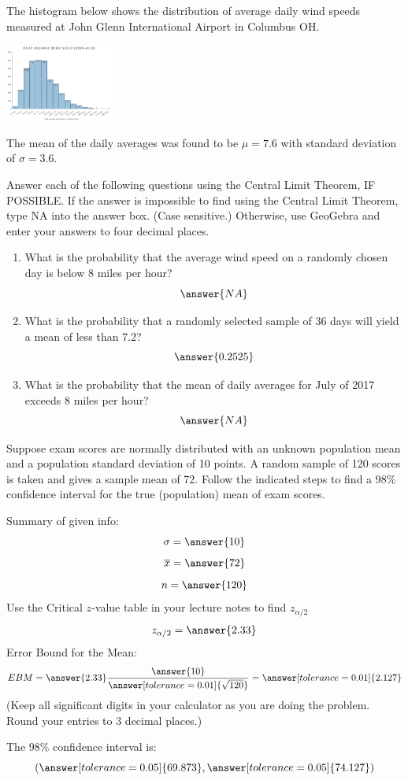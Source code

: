 \documentclass{ximera}
\begin{document}
\begin{problem}\label{prob:140hom6prob3}
The histogram below shows the distribution of average daily wind speeds measured at John Glenn International Airport in Columbus OH.
\begin{image}
   \includegraphics[height=1in]{140H6pic1.jpg}
 \end{image}
 The mean of the daily averages was found to be $\mu=7.6$ with standard deviation of $\sigma=3.6$.
 
 Answer each of the following questions using the Central Limit Theorem, IF POSSIBLE.  If the answer is impossible to find using the Central Limit Theorem, type NA into the answer box. (Case sensitive.)  Otherwise, use GeoGebra and enter your answers to four decimal places.
 \begin{enumerate}
     \item What is the probability that the average wind speed on a randomly chosen day is below 8 miles per hour?
     $$\answer{NA}$$
     \item What is the probability that a randomly selected sample of 36 days will yield a mean of less than 7.2?
     $$\answer{0.2525}$$
     \item What is the probability that the mean of daily averages for July of 2017 exceeds 8 miles per hour?
     $$\answer{NA}$$
     
 \end{enumerate}
\end{problem}
 
\begin{problem}\label{prob:140hom6prob4}
Suppose exam scores are normally distributed with an unknown population mean and a population standard deviation of 10 points. A random sample of 120 scores is taken and gives a sample mean of 72. Follow the indicated steps to find a 98\% confidence interval for the true (population) mean of exam scores.

Summary of given info:
$$\sigma=\answer{10}$$
$$\overline{x}=\answer{72}$$
$$n=\answer{120}$$
Use the Critical $z$-value table in your lecture notes to find $z_{\alpha/2}$
$$z_{\alpha/2}=\answer{2.33}$$
Error Bound for the Mean:
$$EBM=\answer{2.33}\frac{\answer{10}}{\answer[tolerance=0.01]{\sqrt{120}}}=\answer[tolerance=0.01]{2.127}$$
(Keep all significant digits in your calculator as you are doing the problem.  Round your entries to 3 decimal places.)

The 98\% confidence interval is:
$$(\answer[tolerance=0.05]{69.873},\answer[tolerance=0.05]{74.127})$$
\end{problem}
\end{document}
